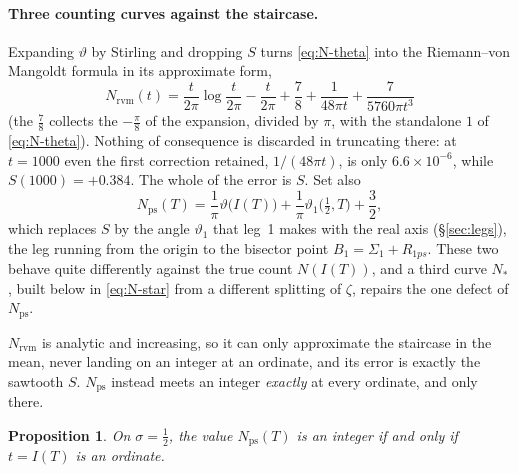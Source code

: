 \documentclass[11pt]{article}
\newtheorem{proposition}[theorem]{Proposition}
\theoremstyle{definition}
\begin{document}
\paragraph{Three counting curves against the staircase.} Expanding $\vartheta$ by
Stirling and dropping $S$ turns \eqref{eq:N-theta} into the Riemann--von
Mangoldt formula in its approximate form,
\begin{equation}\label{eq:N-rvm}
N_{\mathrm{rvm}}(t)
=\frac{t}{2\pi}\log\frac{t}{2\pi}-\frac{t}{2\pi}+\frac78
+\frac{1}{48\pi t}+\frac{7}{5760\pi t^{3}}
\end{equation}
(the $\tfrac78$ collects the $-\tfrac\pi8$ of the expansion, divided by $\pi$,
with the standalone $1$ of \eqref{eq:N-theta}). Nothing of consequence is
discarded in truncating there: at $t=1000$ even the first correction retained,
$1/(48\pi t)$, is only $6.6\times10^{-6}$, while $S(1000)=+0.384$. The whole of
the error is $S$. Set also
\begin{equation}\label{eq:N-ps}
N_{\mathrm{ps}}(T)
=\frac{1}{\pi}\vartheta\bigl(I(T)\bigr)
+\frac{1}{\pi}\vartheta_1\bigl(\tfrac12,T\bigr)+\frac32 ,
\end{equation}
which replaces $S$ by the angle $\vartheta_1$ that leg~1 makes with the real
axis (\S\ref{sec:legs}), the leg running from the origin to the bisector point
$B_1=\Sigma_1+R_{1ps}$. These two behave quite differently against the true
count $N(I(T))$, and a third curve $N_{\ast}$, built below in
\eqref{eq:N-star} from a different splitting of $\zeta$, repairs the one defect
of $N_{\mathrm{ps}}$.

$N_{\mathrm{rvm}}$ is analytic and increasing, so it can only approximate the
staircase in the mean, never landing on an integer at an ordinate, and its
error is exactly the sawtooth $S$.
$N_{\mathrm{ps}}$ instead meets an integer \emph{exactly} at every ordinate,
and only there.

\begin{proposition}\label{prop:N-ps-integer}
On $\sigma=\tfrac12$, the value $N_{\mathrm{ps}}(T)$ is an integer if and only
if $t=I(T)$ is an ordinate.
\end{proposition}
\end{document}
